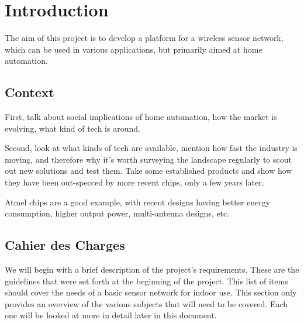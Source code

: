 \chapter{Introduction}\label{ch:introduction}

The aim of this project is to develop a platform for a wireless sensor network,
which can be used in various applications, but primarily aimed at home
automation. 

\section{Context}\label{sec:context}

First, talk about social implications of home automation, how the market is
evolving, what kind of tech is around.

Second, look at what kinds of tech are available, mention how fast the industry
is moving, and therefore why it's worth surveying the landscape regularly to
scout out new solutions and test them. Take some established products and show
how they have been out-specced by more recent chips, only a few years later. 

Atmel chips are a good example, with recent designs having better energy
consumption, higher output power, multi-antenna designs, etc.

\section{Cahier des Charges}\label{sec:cdc}

We will begin with a brief description of the project's requirements. These are
the guidelines that were set forth at the beginning of the project. This list of
items should cover the needs of a basic sensor network for indoor use. This
section only provides an overview of the various subjects that will need to be
covered. Each one will be looked at more in detail later in this document.

